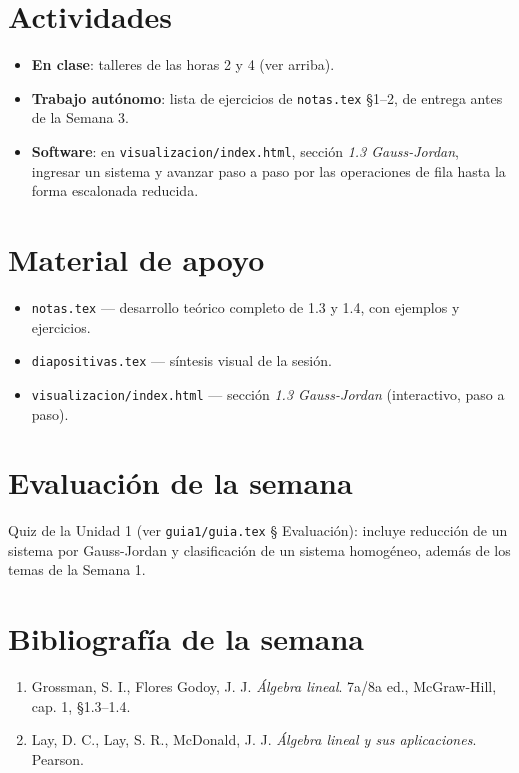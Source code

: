 \documentclass[11pt,letterpaper]{article}
\begin{document}
\section{Actividades}

\begin{itemize}[leftmargin=1.2cm]
  \item \textbf{En clase}: talleres de las horas 2 y 4 (ver arriba).
  \item \textbf{Trabajo autónomo}: lista de ejercicios de \texttt{notas.tex} §1--2, de entrega
        antes de la Semana 3.
  \item \textbf{Software}: en \texttt{visualizacion/index.html}, sección \emph{1.3
        Gauss-Jordan}, ingresar un sistema y avanzar paso a paso por las operaciones de fila
        hasta la forma escalonada reducida.
\end{itemize}

\section{Material de apoyo}

\begin{itemize}[leftmargin=1.2cm]
  \item \texttt{notas.tex} --- desarrollo teórico completo de 1.3 y 1.4, con ejemplos y ejercicios.
  \item \texttt{diapositivas.tex} --- síntesis visual de la sesión.
  \item \texttt{visualizacion/index.html} --- sección \emph{1.3 Gauss-Jordan} (interactivo, paso
        a paso).
\end{itemize}

\section{Evaluación de la semana}

Quiz de la Unidad 1 (ver \texttt{guia1/guia.tex} § Evaluación): incluye reducción de un sistema
por Gauss-Jordan y clasificación de un sistema homogéneo, además de los temas de la Semana 1.

\section{Bibliografía de la semana}

\begin{enumerate}[leftmargin=1.2cm]
  \item Grossman, S. I., Flores Godoy, J. J. \emph{Álgebra lineal}. 7a/8a ed., McGraw-Hill,
        cap. 1, §1.3--1.4.
  \item Lay, D. C., Lay, S. R., McDonald, J. J. \emph{Álgebra lineal y sus aplicaciones}. Pearson.
\end{enumerate}
\end{document}
